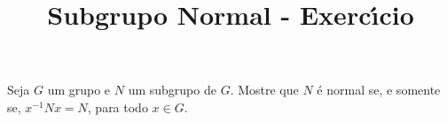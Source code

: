 \documentclass{beamer}
\title{Subgrupo Normal - Exerc{\'\i}cio}
\author[\autor]{\autor}
\institute[\instituto]{\instituto}
\date{}
\begin{document}


    \begin{frame}
        \begin{exercicio}
            Seja $G$ um grupo e $N$ um subgrupo de $G$. Mostre que $N$ \'e normal se, e somente se, $x^{-1}Nx = N$, para todo $x \in G$.
        \end{exercicio}
    \end{frame}
\end{document}
